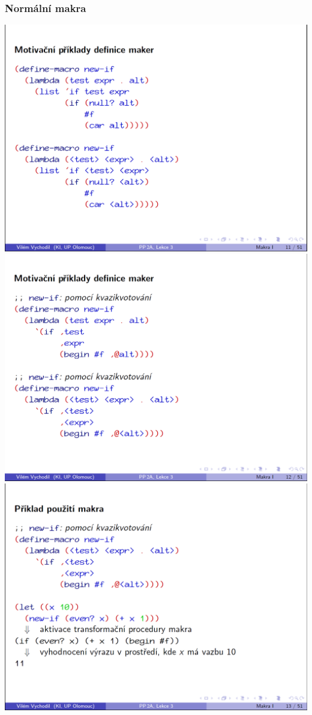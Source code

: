 \documentclass[10pt,a4paper]{article}
\begin{document}
\subsubsection{Normální makra}
\begin{center}
	\includegraphics[scale=0.25]{img/makra_normalni_pouziti_1}
	\includegraphics[scale=0.25]{img/makra_normalni_pouziti_2}
	\includegraphics[scale=0.25]{img/makra_normalni_pouziti_3}
\end{center}
\end{document}
